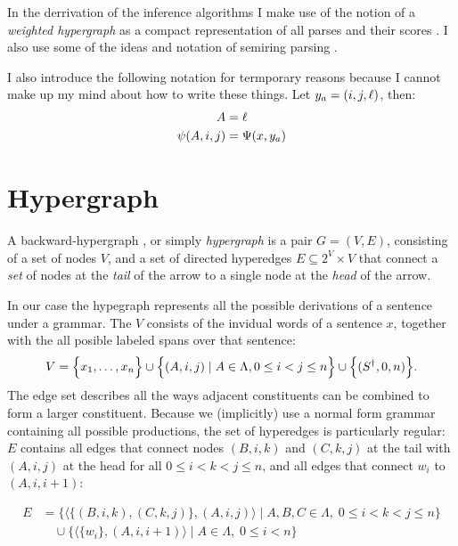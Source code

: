 % 

In the derrivation of the inference algorithms I make use of the notion of a \textit{weighted hypergraph} as a compact representation of all parses and their scores \citep{gallo1993directed,klein2004parsing}. I also use some of the ideas and notation of semiring parsing \citep{goodman1999semiring,eisner2009semirings}.

I also introduce the following notation for termporary reasons because I cannot make up my mind about how to write these things. Let $y_a = (i, j, \ell)$, then:
\begin{align*}
  A &= \ell  \\
  \psi(A, i, j) &= \Psi(x, y_a)
\end{align*}

\section{Hypergraph}
  A backward-hypergraph \citep{gallo1993directed}, or simply \textit{hypergraph} is a pair $G = (V, E)$, consisting of a set of nodes $V$, and a set of directed hyperedges $E \subseteq 2^V \times V$ that connect a \textit{set} of nodes at the \textit{tail} of the arrow to a single node at the \textit{head} of the arrow.

  In our case the hypegraph represents all the possible derivations of a sentence under a grammar. The $V$ consists of the invidual words of a sentence $x$, together with the all posible labeled spans over that sentence:
  \begin{align*}
    V = \Big\{ x_1, \dots, x_n \Big\} \cup \Big\{ (A, i, j) \mid A \in \Lambda, 0 \leq i < j \leq n \Big\} \cup \Big\{ (S^{\dagger}, 0, n) \Big\}.
  \end{align*}
  The edge set describes all the ways adjacent constituents can be combined to form a larger constituent. Because we (implicitly) use a normal form grammar containing all possible productions, the set of hyperedges is particularly regular: $E$ contains all edges that connect nodes $(B, i, k)$ and $(C, k, j)$ at the tail with $(A, i, j)$ at the head for all $0 \leq i < k < j \leq n$, and all edges that connect $w_i$ to $(A, i, i+1)$:

  \begin{align*}
    E
      &= \Bigg\{ \Big\langle \Big\{ (B, i, k), (C, k, j) \Big\},  (A, i, j) \Big\rangle \; \Bigg\vert \; A, B, C \in \Lambda, \; 0 \leq i < k < j \leq n \Bigg\}  \\
      &\quad\cup \Bigg\{ \Big\langle \{ w_i \}, (A, i, i+1) \Big\rangle \; \Bigg\vert \; A \in \Lambda, \; 0 \leq i < n \Bigg\}  \\
  \end{align*}

